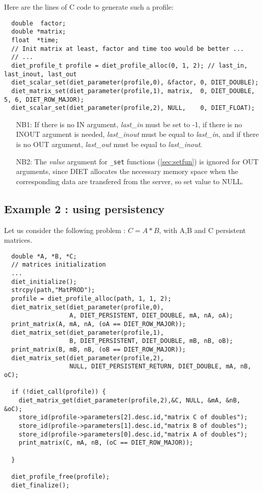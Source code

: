 Here are the lines of C code to generate such a profile:
{\footnotesize
\begin{verbatim}
  double  factor;
  double *matrix;
  float  *time;
  // Init matrix at least, factor and time too would be better ...
  // ...
  diet_profile_t profile = diet_profile_alloc(0, 1, 2); // last_in, last_inout, last_out
  diet_scalar_set(diet_parameter(profile,0), &factor, 0, DIET_DOUBLE);
  diet_matrix_set(diet_parameter(profile,1), matrix,  0, DIET_DOUBLE, 5, 6, DIET_ROW_MAJOR);
  diet_scalar_set(diet_parameter(profile,2), NULL,    0, DIET_FLOAT);
\end{verbatim}
}

\begin{itemize}
\item[NB1:] If there is no IN argument, \emph{last\_in} must be set to
  -1, if there is no INOUT argument is needed, \emph{last\_inout} must
  be equal to \emph{last\_in}, and if there is no OUT argument,
  \emph{last\_out} must be equal to \emph{last\_inout}.
\item[NB2:] The \emph{value} argument for \texttt{\_set} functions
  (\ref{sec:setfun}) is ignored for OUT arguments, since DIET
  allocates the necessary memory space when the corresponding data are
  transfered from the server, so set value to NULL.
\end{itemize}

\subsection{Example 2 : using persistency}


Let us consider the following problem : $C=A*B$, with A,B and C persistent matrices.


{\footnotesize
\begin{verbatim}
  double *A, *B, *C; 
  // matrices initialization
  ...
  diet_initialize();
  strcpy(path,"MatPROD");
  profile = diet_profile_alloc(path, 1, 1, 2);
  diet_matrix_set(diet_parameter(profile,0),
                  A, DIET_PERSISTENT, DIET_DOUBLE, mA, nA, oA);
  print_matrix(A, mA, nA, (oA == DIET_ROW_MAJOR));
  diet_matrix_set(diet_parameter(profile,1),
                  B, DIET_PERSISTENT, DIET_DOUBLE, mB, nB, oB);
  print_matrix(B, mB, nB, (oB == DIET_ROW_MAJOR));
  diet_matrix_set(diet_parameter(profile,2),
                  NULL, DIET_PERSISTENT_RETURN, DIET_DOUBLE, mA, nB, oC);
  
  if (!diet_call(profile)) {
    diet_matrix_get(diet_parameter(profile,2),&C, NULL, &mA, &nB, &oC);
    store_id(profile->parameters[2].desc.id,"matrix C of doubles");
    store_id(profile->parameters[1].desc.id,"matrix B of doubles");
    store_id(profile->parameters[0].desc.id,"matrix A of doubles");
    print_matrix(C, mA, nB, (oC == DIET_ROW_MAJOR));
      
  }

  diet_profile_free(profile);
  diet_finalize();
\end{verbatim}
}

